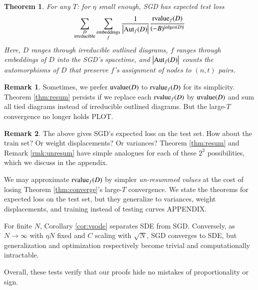 \documentclass{article}
\theoremstyle{plain}
\newtheorem{thm}{Theorem}
\theoremstyle{definition}
\newtheorem{rmk}{Remark}
\newcommand{\wabs}[1]{\left|#1\right|}
\newcommand{\Aut}{\text{\textnormal{Aut}}}
\newcommand{\uvalue}{\text{\textnormal{uvalue}}}
\newcommand{\rvalue}{\text{\textnormal{rvalue}}}
\newcommand{\edges}{\text{\textnormal{edges}}}
\begin{document}
        \begin{thm}
            For any $T$: for $\eta$ small enough, SGD has expected test loss
            \begin{equation*} \label{eq:resum}
                \sum_{\substack{D \\ \text{irreducible}}}
                \sum_{\substack{\text{embeddings} \\ f}}
                \frac{1}{\wabs{\Aut_f(D)}}
                \frac{{\rvalue_f}(D)}{(-B)^{|\edges(D)|}}
            \end{equation*}
            Here, $D$ ranges through irreducible outlined diagrams, $f$ ranges
            through embeddings of $D$ into the SGD's spacetime, and
            $\wabs{\Aut_f(D)}$ counts the automorphisms of $D$ that
            preserve $f$'s assignment of nodes to $(n,t)$ pairs.
        \end{thm}

        \begin{rmk}
            Sometimes, we prefer $\uvalue(D)$ to $\rvalue_f(D)$ for its
            simplicity.  Theorem \ref{thm:resum} persists if we replace each
            $\rvalue_f(D)$ by $\uvalue(D)$ and sum all tied diagrams instead
            of irreducible outlined diagrams.  But the large-$T$ convergence
            no longer holds {\color{red} PLOT}.
        \end{rmk}


        \begin{rmk}
            The above gives SGD's expected loss on the test set.  How about
            the train set?  Or weight displacements?  Or variances?
            Theorem \ref{thm:resum} and Remark \ref{rmk:unresum} have simple
            analogues for each of these $2^3$ possibilities, which we discuss
            in the appendix. 
        \end{rmk}

        We may approximate $\rvalue_f(D)$ by simpler \emph{un-resummed values}
        at the cost of losing Theorem \ref{thm:converge}'s large-$T$ convergence.
        We state the theorems for expected loss on the test set, but they
        generalize to variances, weight displacements, and training instead of
        testing curves {\color{red} APPENDIX}.
 
            For finite $N$, Corollary \ref{cor:vsode} separates SDE from SGD.  Conversely, as
            $N\to\infty$ with $\eta N$ fixed and $C$ scaling with $\sqrt{N}$, SGD
            converges to SDE, but generalization and optimization respectively
            become trivial and computationally intractable.


        Overall, these
        tests verify that our proofs hide no mistakes of proportionality or
        sign.  
 
\end{document}

